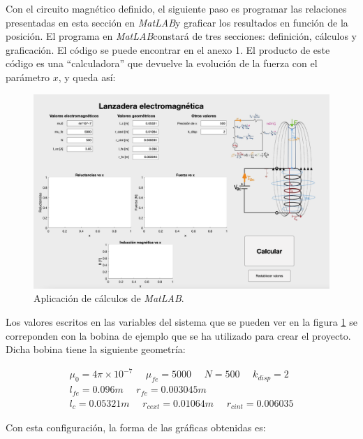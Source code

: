 Con el circuito magnético definido, el siguiente paso es programar las relaciones presentadas en esta sección en \textit{MatLAB}\textregistered y graficar los resultados en función de la posición. El programa en \textit{MatLAB}\textregistered constará de tres secciones: definición, cálculos y graficación. El código se puede encontrar en el anexo 1. El producto de este código es una ``calculadora'' que devuelve la evolución de la fuerza con el parámetro \(x\), y queda así:

\begin{figure}[H]
    \centering
    \includegraphics[width=\linewidth]{FigurasMemoria/calculadora.png}
    \caption{Aplicación de cálculos de \textit{MatLAB}\textregistered.}
    \label{fig:calculadora} %
\end{figure}

\newpage

Los valores escritos en las variables del sistema que se pueden ver en la figura \ref{fig:calculadora} se correponden con la bobina de ejemplo que se ha utilizado para crear el proyecto. Dicha bobina tiene la siguiente geometría:

\[
\begin{array}{c}
    \mu_0 = 4\pi \times 10^{-7}~~~~~~\mu_{fe} = 5000~~~~~~N = 500 ~~~~~~ k_{disp} = 2 \\
    l_{fe} = 0.096m~~~~~~r_{fe} = 0.003045m \\
    l_c = 0.05321m~~~~~~r_{cext} = 0.01064m~~~~~~r_{cint}=0.006035 
\end{array}
\]

Con esta configuración, la forma de las gráficas obtenidas es:

